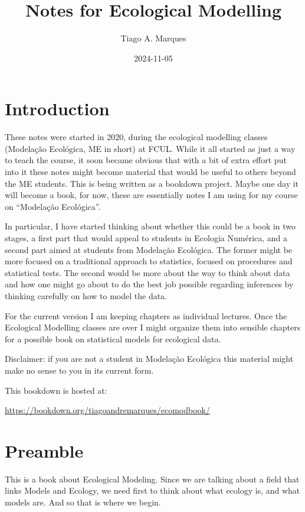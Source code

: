 \documentclass[
]{book}
\title{Notes for Ecological Modelling}
\author{Tiago A. Marques}
\date{2024-11-05}
\begin{document}
\maketitle

{
\setcounter{tocdepth}{1}
\tableofcontents
}
\chapter{Introduction}\label{introduction}

These notes were started in 2020, during the ecological modelling classes (Modelação Ecológica, ME in short) at FCUL. While it all started as just a way to teach the course, it soon became obvious that with a bit of extra effort put into it these notes might become material that would be useful to others beyond the ME students. This is being written as a bookdown project. Maybe one day it will become a book, for now, these are essentially notes I am using for my course on ``Modelação Ecológica''.

In particular, I have started thinking about whether this could be a book in two stages, a first part that would appeal to students in Ecologia Numérica, and a second part aimed at students from Modelação Ecológica. The former might be more focused on a traditional approach to statistics, focused on procedures and statistical tests. The second would be more about the way to think about data and how one might go about to do the best job possible regarding inferences by thinking carefully on how to model the data.

For the current version I am keeping chapters as individual lectures. Once the Ecological Modelling classes are over I might organize them into sensible chapters for a possible book on statistical models for ecological data.

Disclaimer: if you are not a student in Modelação Ecológica this material might make no sense to you in its current form.

This bookdown is hosted at:

\url{https://bookdown.org/tiagoandremarques/ecomodbook/}

\chapter{Preamble}\label{mainintro}

This is a book about Ecological Modeling. Since we are talking about a field that links Models and Ecology, we need first to think about what ecology is, and what models are. And so that is where we begin.
\end{document}
